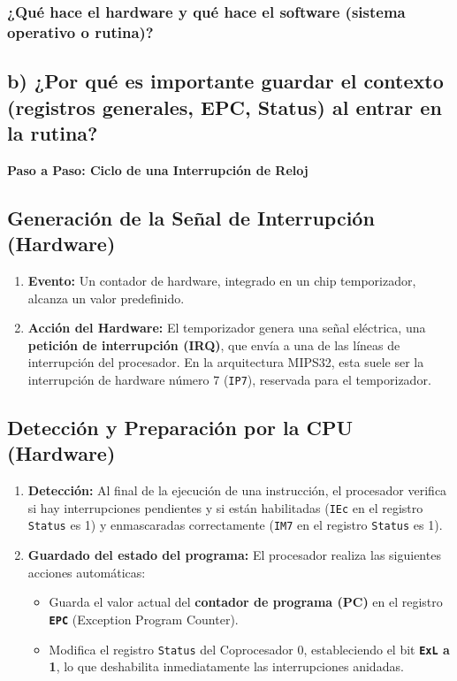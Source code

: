 \documentclass{article}
\begin{document}
{{\subsubsection*{¿Qué hace el hardware y qué hace el software (sistema operativo o rutina)?}

\subsection*{b) ¿Por qué es importante guardar el contexto (registros generales, EPC, Status) al entrar en la rutina?}

\quad

\textbf{Paso a Paso: Ciclo de una Interrupción de Reloj}

\quad

\subsection{ Generación de la Señal de Interrupción (Hardware)}
\begin{enumerate}
    \item \textbf{Evento:} Un contador de hardware, integrado en un chip temporizador, alcanza un valor predefinido.
    \item \textbf{Acción del Hardware:} El temporizador genera una señal eléctrica, una \textbf{petición de interrupción (IRQ)}, que envía a una de las líneas de interrupción del procesador. En la arquitectura MIPS32, esta suele ser la interrupción de hardware número 7 (\texttt{IP7}), reservada para el temporizador.
\end{enumerate}

\subsection{ Detección y Preparación por la CPU (Hardware)}
\begin{enumerate}
    \item \textbf{Detección:} Al final de la ejecución de una instrucción, el procesador verifica si hay interrupciones pendientes y si están habilitadas (\texttt{IEc} en el registro \texttt{Status} es 1) y enmascaradas correctamente (\texttt{IM7} en el registro \texttt{Status} es 1).
    \item \textbf{Guardado del estado del programa:} El procesador realiza las siguientes acciones automáticas:
    \begin{itemize}
        \item Guarda el valor actual del \textbf{contador de programa (PC)} en el registro \textbf{\texttt{EPC}} (Exception Program Counter).
        \item Modifica el registro \texttt{Status} del Coprocesador 0, estableciendo el bit \textbf{\texttt{ExL} a 1}, lo que deshabilita inmediatamente las interrupciones anidadas.
    \end{itemize}
\end{enumerate}

}}
\end{document}
